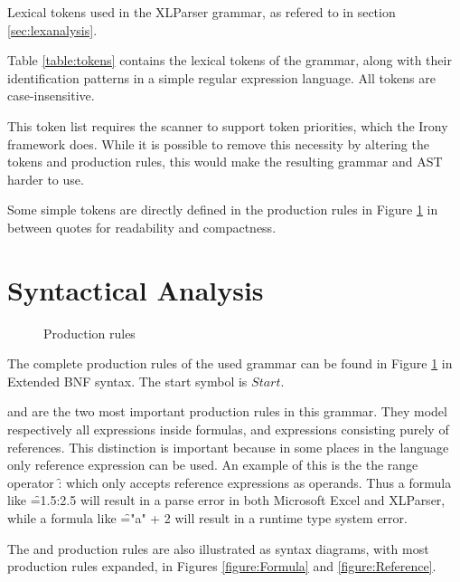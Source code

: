 \begin{table}
\tiny
\caption{Lexical tokens used in the XLParser grammar, as refered to in section \ref{sec:lexanalysis}.}
\label{table:tokens}
\centerfloat

\end{table}


Table \ref{table:tokens} contains the lexical tokens of the grammar, along with their identification patterns in a simple regular expression language. All tokens are case-insensitive.

This token list requires the scanner to support token priorities, which the Irony framework does.
While it is possible to remove this necessity by altering the tokens and production rules, this would make the resulting grammar and AST harder to use.

Some simple tokens are directly defined in the production rules in Figure \ref{figure:productions} in between quotes for readability and compactness.

\section{Syntactical Analysis}

\begin{figure}
\small
\caption{Production rules}
\label{figure:productions}
\begin{multicols*}{2}

\end{multicols*}
\end{figure}

The complete production rules of the used grammar can be found in Figure \ref{figure:productions} in Extended BNF syntax.
The start symbol is $Start$.

 and  are the two most important production rules in this grammar.
They model respectively all expressions inside formulas, and expressions consisting purely of references.
This distinction is important because in some places in the language only reference expression can be used.
An example of this is the the range operator \f{:} which only accepts reference expressions as operands.
Thus a formula like \f{=1.5:2.5} will result in a parse error in both Microsoft Excel and XLParser, while a formula like \f{="a" + 2} will result in a runtime type system error.

The  and  production rules are also illustrated as syntax diagrams, with most production rules expanded, in Figures \ref{figure:Formula} and \ref{figure:Reference}.

